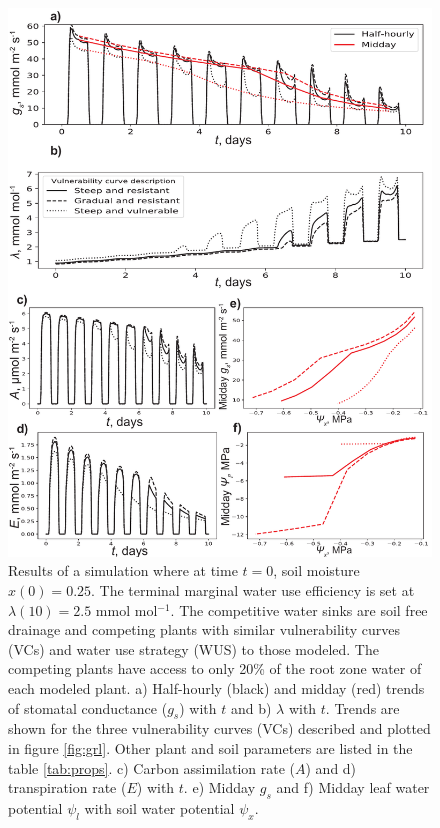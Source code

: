 \documentclass[utf8]{frontiersSCNS} %
\begin{document}
\begin{figure}[h]
    \begin{center}
         \includegraphics[scale=0.65]{WUS_comp.pdf}   
    \end{center}
    \caption{Results of a simulation where at time $t=0$, soil moisture $x(0) =0.25$. The terminal marginal water use efficiency is set at $\lambda(10) = 2.5$ mmol mol$^{-1}$. The competitive water sinks are soil free drainage and competing plants with similar vulnerability curves (VCs) and water use strategy (WUS) to those modeled. The competing plants have access to only 20\% of the root zone water of each modeled plant. a) Half-hourly (black) and midday (red) trends of stomatal conductance ($g_s$) with $t$ and b) $\lambda$ with $t$. Trends are shown for the three vulnerability curves (VCs) described and plotted in figure \ref{fig:grl}. Other plant and soil parameters are listed in the table \ref{tab:props}. c) Carbon assimilation rate ($A$) and d) transpiration rate ($E$) with $t$. e) Midday $g_s$ and f) Midday leaf water potential $\psi_l$ with soil water potential $\psi_x$.}
    \label{fig:WUS_comp}
\end{figure}
\end{document}
